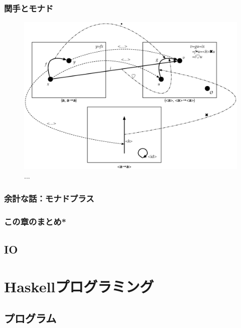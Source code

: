 \documentclass[a4paper]{jsbook}
\newcommand{\programminglanguage}[1]{\textsf{#1}}
\newcommand{\haskell}{\programminglanguage{Haskell}}
\begin{document}
\section{関手とモナド}

\begin{figure}
\begin{center}
\includegraphics[width=140mm]{fig/functor.eps}
\end{center}
\caption{...}
\label{fig:functor}
\end{figure}



\section{余計な話：モナドプラス}
\section*{この章のまとめ*}

\chapter{IO}
\part{\haskell プログラミング}

\chapter{プログラム}
\end{document}
